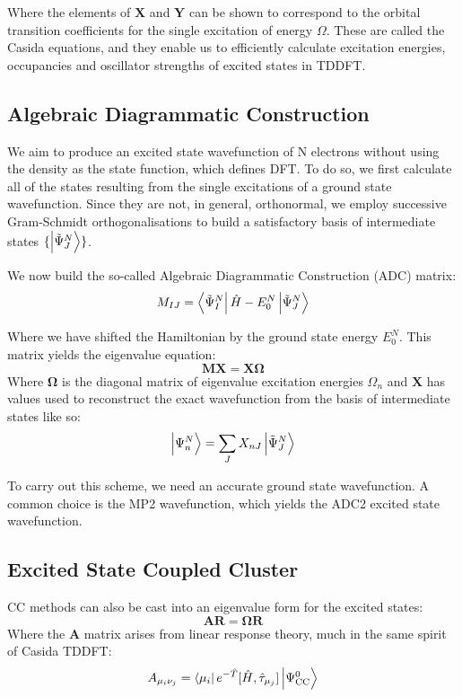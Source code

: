 Where the elements of $\bm{X}$ and $\bm{Y}$ can be shown to correspond to the orbital transition coefficients for the single excitation of energy $\Omega$. These are called the Casida equations,\cite{Casida1998} and they enable us to efficiently calculate excitation energies, occupancies and oscillator strengths of excited states in TDDFT.


\subsection{Algebraic Diagrammatic Construction}
We aim to produce an excited state wavefunction of N electrons without using the density as the state function, which defines DFT. To do so, we first calculate all of the states resulting from the single excitations of a ground state wavefunction. Since they are not, in general, orthonormal, we employ successive Gram-Schmidt orthogonalisations to build a satisfactory basis of intermediate states $\{\ket{\tilde{\Psi}^N_J}\}$.\cite{Schirmer2004}

We now build the so-called Algebraic Diagrammatic Construction (ADC) matrix:
\begin{equation}
    M_{IJ}=\bra{\tilde{\Psi}^N_I}\hat{H}-E^N_0\ket{\tilde{\Psi}^N_J}
\end{equation}

Where we have shifted the Hamiltonian by the ground state energy $E^N_0$. This matrix yields the eigenvalue equation:
\begin{equation}
    \bm{MX}=\bm{X\Omega}
\end{equation}
Where $\bm{\Omega}$ is the diagonal matrix of eigenvalue excitation energies $\Omega_n$ and $\bm{X}$ has values used to reconstruct the exact wavefunction from the basis of intermediate states like so:
\begin{equation}
    \ket{\Psi^N_n} = \sum_J X_{nJ} \ket{\tilde{\Psi}^N_J}
\end{equation}

To carry out this scheme, we need an accurate ground state wavefunction. A common choice is the MP2 wavefunction, which yields the ADC2 excited state wavefunction.\cite{Trofimov1995,Trofimov1997}

\subsection{Excited State Coupled Cluster}

CC methods can also be cast into an eigenvalue form for the excited states:\cite{Sneskov2012}
\begin{equation}
    \bm{AR}=\bm{\Omega{}R}
\end{equation}
Where the $\bm{A}$ matrix arises from linear response theory, much in the same spirit of Casida TDDFT:
\begin{equation}
    A_{\mu_i \nu_j} = \bra{\mu_i} e^{-\hat{T}}[\hat{H},\hat{\tau}_{\mu_j}]\ket{\Psi^0_{\text{CC}}}
\end{equation}

